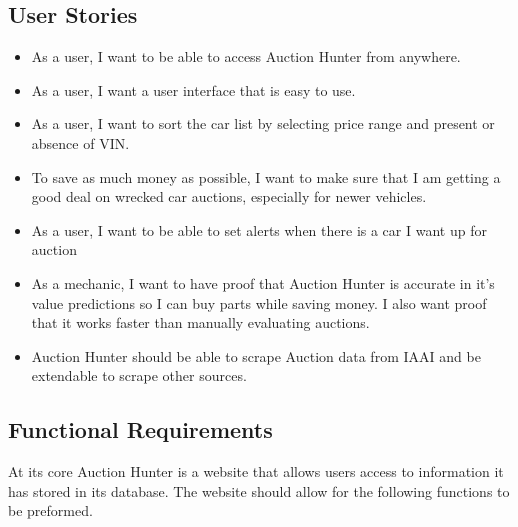 \documentclass[onecolumn, draftclsnofoot,10pt, compsoc]{IEEEtran}
\begin{document}
\subsection{User Stories}
\begin{itemize}
\item As a user, I want to be able to access Auction Hunter from anywhere.
\item As a user, I want a user interface that is easy to use.
\item As a user, I want to sort the car list by selecting price range and present or absence of VIN. 
\item To save as much money as possible, I want to make sure that I am getting a good deal on wrecked car auctions, especially for newer vehicles.
\item As a user, I want to be able to set alerts when there is a car I want up for auction
\item As a mechanic, I want to have proof that Auction Hunter is accurate in it's value predictions so I can buy parts while saving money. I also want proof that it works faster than manually evaluating auctions.
\item Auction Hunter should be able to scrape Auction data from IAAI and be extendable to scrape other sources.
\end{itemize}

\subsection{Functional Requirements}
At its core Auction Hunter is a website that allows users access to information it has stored in its database. The website should allow for the following functions to be preformed.
\end{document}
